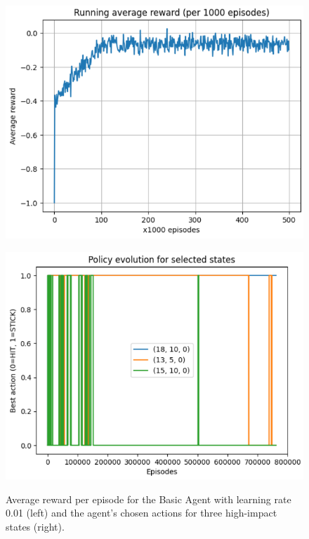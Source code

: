 \documentclass{article}
\begin{document}
\begin{figure}[h!]
  \centering
  \begin{minipage}{0.48\textwidth}
    \centering
    \includegraphics[width=\linewidth]{Images/0.01a_plot.png}
    \label{fig:0.01a_plot}
  \end{minipage}\hfill
  \begin{minipage}{0.48\textwidth}
    \centering
    \includegraphics[width=\linewidth]{Images/0.01a_plot.2.png}
    \label{fig:0.01a_plot_2}
  \end{minipage}
  \caption{Average reward per episode for the Basic Agent with learning rate 0.01 (left) and the agent's chosen actions for three high-impact states (right).}
\end{figure}
\end{document}
